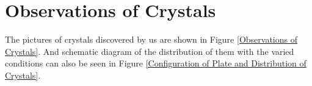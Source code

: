 \documentclass[UTF-8]{article}
\begin{document}
\section{Observations of Crystals}
The pictures of crystals discovered by us are shown in Figure \ref{Observations of Crystals}.
And schematic diagram of the distribution of them with the varied conditions can also be seen in Figure \ref{Configuration of Plate and Distribution of Crystals}.


\begin{figure}[ht]
    \centering
    
    \hfill
    \hfill
    
    \vfill %
    

\end{figure}
\end{document}
